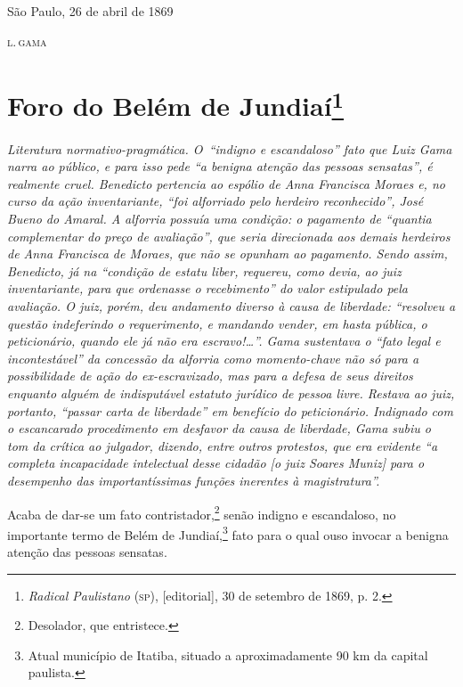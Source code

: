 \begin{flushright}
São Paulo, 26 de abril de 1869

\textsc{l.\,gama}
\end{flushright}

\chapter{Foro do Belém de Jundiaí\footnote{\emph{Radical Paulistano}
  (\textsc{sp}), {[}editorial{]}, 30 de setembro de 1869, p. 2.}}

\begin{didascalia}\itshape
Literatura normativo-pragmática. O~``indigno e escandaloso'' fato que Luiz
Gama narra ao público, e para isso pede ``a benigna atenção das pessoas
sensatas'', é realmente cruel. Benedicto pertencia ao espólio de Anna
Francisca Moraes e, no curso da ação inventariante, ``foi alforriado pelo
herdeiro reconhecido'', José Bueno do Amaral. A alforria possuía uma
condição: o pagamento de ``quantia complementar do preço de avaliação'',
que seria direcionada aos demais herdeiros de Anna Francisca de Moraes,
que não se opunham ao pagamento. Sendo assim, Benedicto, já na ``condição
de \textnormal{estatu liber}, requereu, como devia, ao juiz inventariante,
para que ordenasse o recebimento'' do valor estipulado pela avaliação. O
juiz, porém, deu andamento diverso à causa de liberdade: ``resolveu a
questão indeferindo o requerimento, e mandando vender, em hasta pública,
o peticionário, quando ele já não era escravo!\ldots{}''. Gama sustentava o
``fato legal e incontestável'' da concessão da alforria como momento-chave
não só para a possibilidade de ação do ex-escravizado, mas para a defesa
de seus direitos enquanto alguém de indisputável estatuto jurídico de
pessoa livre. Restava ao juiz, portanto, ``passar carta de liberdade'' em
benefício do peticionário. Indignado com o escancarado procedimento em
desfavor da causa de liberdade, Gama subiu o tom da crítica ao julgador,
dizendo, entre outros protestos, que era evidente ``a completa
incapacidade intelectual desse cidadão {[}o juiz Soares Muniz{]} para o
desempenho das importantíssimas funções inerentes à magistratura''.
\end{didascalia}



Acaba de dar-se um fato contristador,\footnote{Desolador, que
  entristece.} senão indigno e escandaloso, no importante termo de
Belém de Jundiaí,\footnote{Atual município de Itatiba, situado a
  aproximadamente 90 km da capital paulista.} fato para o qual ouso
invocar a benigna atenção das pessoas sensatas.

